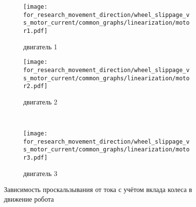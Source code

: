 \begin{figure}[H]
    \centering
    \begin{subfigure}{0.49\textwidth}
        \centering
        \texttt{[image: for\_research\_movement\_direction/wheel\_slippage\_vs\_motor\_current/common\_graphs/linearization/motor1.pdf]}
        \caption{двигатель 1}
    \end{subfigure}
    \hspace{0.005\textwidth}
    \begin{subfigure}{0.49\textwidth}
        \centering
        \texttt{[image: for\_research\_movement\_direction/wheel\_slippage\_vs\_motor\_current/common\_graphs/linearization/motor2.pdf]}
        \caption{двигатель 2}
    \end{subfigure} \\
    \vspace{4pt}
    \centering
    \begin{subfigure}{0.49\textwidth}
        \centering
        \texttt{[image: for\_research\_movement\_direction/wheel\_slippage\_vs\_motor\_current/common\_graphs/linearization/motor3.pdf]}
        \caption{двигатель 3}
    \end{subfigure}
    \caption{Зависимость проскальзывания от тока с учётом вклада колеса в движение робота}
\end{figure}